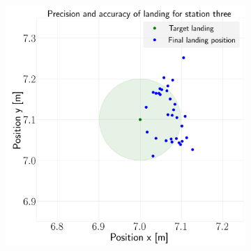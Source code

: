 \documentclass[../Head/report.tex]{subfiles}
\begin{document}
\begin{figure}[H]
\begin{subfigure}[t]{.30\textwidth}
        \caption{}
        \label{fig:vision_based_landing_landing_station_two_test3}
    \end{subfigure}
     \hspace{0.2em}
    \begin{subfigure}[t]{.30\textwidth}
        \centering
        \includegraphics[width=\textwidth]{../Figures/landing_test/test3_speed_0.9_error_0.1/landing_for_station_three.png}
        \caption{}
        \label{fig:vision_based_landing_landing_station_three_test3}
    \end{subfigure}
    \caption{}
    \label{fig:vision_based_landing_test3}
\end{figure}
\end{document}
